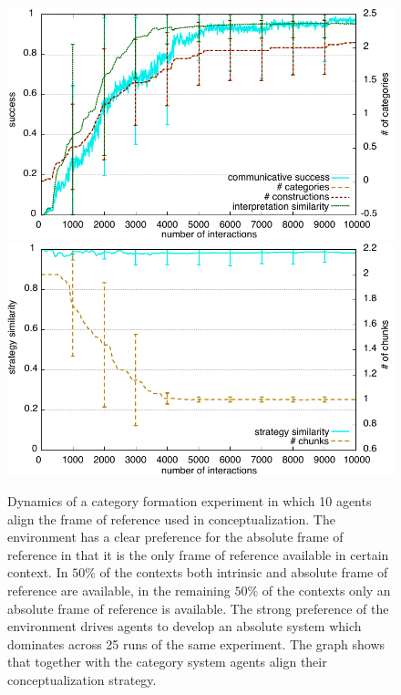 \begin{figure}
\begin{center}
\includegraphics[width=0.9\columnwidth]{figs/chunk-alignment-frames-absolute-vs-intrinsic}
\includegraphics[width=0.9\columnwidth]{figs/chunk-alignment-frames-absolute-vs-intrinsic-alignment}
\end{center}
\caption[Results category formation and frame of reference alignment]{
Dynamics of a category formation experiment in which 10 agents align the frame of reference
used in conceptualization. The environment has a clear preference for the absolute frame of reference
in that it is the only frame of reference available in certain context. 
In $50\%$ of the contexts both intrinsic and absolute
frame of reference are available, in the remaining $50\%$ of the contexts only an absolute frame
of reference is available. The strong preference of the environment drives agents to develop 
an absolute system which dominates across 25 runs of the same experiment. The graph shows 
that together with the category system agents align their conceptualization strategy.}
\label{f:chunk-alignment-frames-absolute-vs-intrinsic}
\end{figure}



